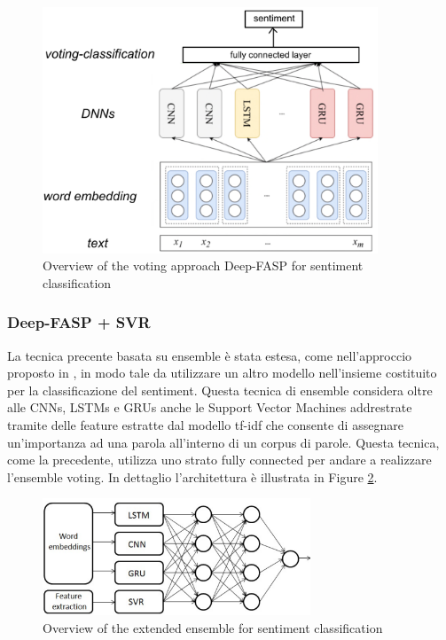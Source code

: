 \begin{figure}[!ht]
    \centering
    \includegraphics[width=10cm]{./images/deep_FASP.png}
    \caption{Overview of the voting approach Deep-FASP \cite{10.1145/3184558.3191829} for sentiment classification}
    \label{fig:deep_fasp}
\end{figure}

\subsubsection{Deep-FASP + SVR}
La tecnica precente basata su ensemble è stata estesa, come nell'approccio proposto in \cite{inproceedings}, in modo tale da utilizzare un altro modello nell'insieme costituito per la classificazione del sentiment. Questa tecnica di ensemble considera oltre alle CNNs, LSTMs e GRUs anche le Support Vector Machines addrestrate tramite delle feature estratte dal modello tf-idf che consente di assegnare un'importanza ad una parola all'interno di un corpus di parole. 
Questa tecnica, come la precedente, utilizza uno strato fully connected per andare a realizzare l'ensemble voting. In dettaglio l'architettura è illustrata in Figure \ref{fig:ensemble2}.

\begin{figure}[!ht]
    \centering
    \includegraphics[width=8cm]{./images/ensemble_2_architecture.png}
    \caption{Overview of the extended ensemble 
    \label{fig:ensemble2}
     \cite{inproceedings} for sentiment classification}
\end{figure}

